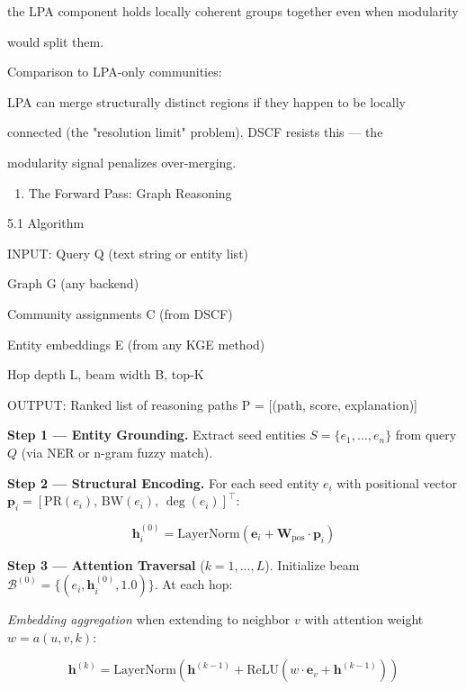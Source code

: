 \documentclass[10pt,journal,compsoc]{IEEEtran}
\begin{document}
the LPA component holds locally coherent groups together even when modularity

would split them.

Comparison to LPA-only communities:

LPA can merge struc\-turally distinct regions if they happen to be locally

connected (the "resolution limit" problem). DSCF resists this — the

modularity signal penalizes over-merging.

\begin{enumerate}
\item The Forward Pass: Graph Reasoning

\end{enumerate}
5.1 Algorithm

INPUT:  Query Q (text string or entity list)

        Graph G (any backend)

        Community assignments C (from DSCF)

        Entity embeddings E (from any KGE method)

        Hop depth L, beam width B, top-K

OUTPUT: Ranked list of reasoning paths P = [(path, score, explanation)]

\textbf{Step 1 — Entity Grounding.} Extract seed entities $S = \{e_1, \ldots, e_n\}$ from query $Q$ (via NER or n-gram fuzzy match).

\textbf{Step 2 — Structural Encoding.} For each seed entity $e_i$ with positional vector $\mathbf{p}_i = [\mathrm{PR}(e_i),\, \mathrm{BW}(e_i),\, \deg(e_i)]^\top$:

\begin{equation}
\mathbf{h}_i^{(0)} = \mathrm{LayerNorm}\!\left(\mathbf{e}_i + \mathbf{W}_{\mathrm{pos}} \cdot \mathbf{p}_i\right)
\end{equation}

\textbf{Step 3 — Attention Traversal} ($k = 1, \ldots, L$). Initialize beam $\mathcal{B}^{(0)} = \{(e_i, \mathbf{h}_i^{(0)}, 1.0)\}$. At each hop:

\textit{Embedding aggregation} when extending to neighbor $v$ with attention weight $w = a(u, v, k)$:

\begin{equation}
\mathbf{h}^{(k)} = \mathrm{LayerNorm}\!\left(\mathbf{h}^{(k-1)} + \mathrm{ReLU}\!\left(w \cdot \mathbf{e}_v + \mathbf{h}^{(k-1)}\right)\right)
\end{equation}
\end{document}
